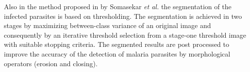 \documentclass[sensors,review,submit,moreauthors,pdftex,10pt,a4paper]{mdpi}
\begin{document}
Also in the method proposed in \cite{Somasekar2017} by Somasekar \emph{et al.} the segmentation of the infected parasites is based on thresholding. The segmentation is achieved in two stages by maximizing between-class variance of an original image and consequently by an iterative threshold selection from a stage-one threshold image with suitable stopping criteria. The segmented results are post processed to improve the accuracy of the detection of malaria parasites by morphological operators (erosion and closing).


\end{document}

